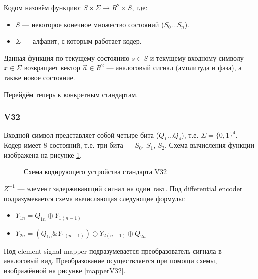 \documentclass[a4paper,12pt]{article}
\begin{document}
Кодом назовём функцию: $S \times \Sigma \rightarrow R^2 \times S$, где:
\begin{itemize}
	\item $S$ --- некоторое конечное множество состояний ($S_0 \ldots S_n$).
	\item $\Sigma$ --- алфавит, с которым работает кодер.
\end{itemize}
Данная функция по текущему состоянию $s \in S$ и текущему входному символу $x \in \Sigma$ возвращает вектор
$\vec{a} \in R^2$ --- аналоговый сигнал (амплитуда и фаза), а также новое состояние.

Перейдём теперь к конкретным стандартам.

\subsubsection{V32}
Входной символ представляет собой четыре бита ($Q_1 \ldots Q_4$), т.е. $\Sigma = \{0, 1\}^4$. Кодер имеет $8$
состояний, т.е. три бита --- $S_0$, $S_1$, $S_2$. Схема вычисления функции изображена на рисунке \ref{schemeV32}.

\begin{figure}
	\caption{Схема кодирующего устройства стандарта V32}
	\label{schemeV32}
\end{figure}

$Z^{-1}$ --- элемент задерживающий сигнал на один такт.
Под differential encoder подразумевается схема вычисляющая следующие формулы:
\begin{itemize}
	\item $Y_{1n} = Q_{1n} \oplus Y_{1(n - 1)}$
	\item $Y_{2n} = (Q_{1n} \& Y_{1(n - 1)}) \oplus Y_{2(n - 1)} \oplus Q_{2n}$
\end{itemize}

Под element signal mapper подразумевается преобразователь сигнала в аналоговый вид. Преобразование осуществляется
при помощи схемы, изображённой на рисунке \ref{mapperV32}.
\end{document}
